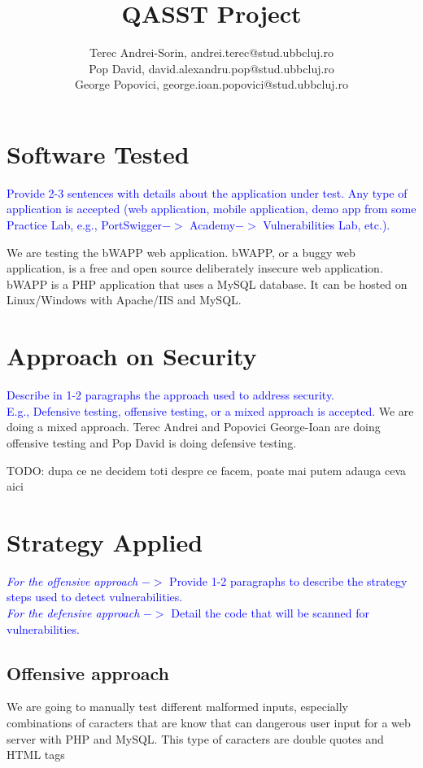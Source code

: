 \documentclass{article}
\title{\textbf{QASST Project}}
\author{Terec Andrei-Sorin, andrei.terec@stud.ubbcluj.ro\\
Pop David, david.alexandru.pop@stud.ubbcluj.ro\\
George Popovici, george.ioan.popovici@stud.ubbcluj.ro}
\begin{document}
\maketitle


\tableofcontents

\newpage

\section{Software Tested}
\label{label:Software_tested}

\textcolor{blue}{Provide 2-3 sentences with details about the application under test. Any type of application is accepted (web application, mobile application, demo app from some Practice Lab, e.g., PortSwigger$->$ Academy$->$ Vulnerabilities Lab, etc.).}

We are testing the bWAPP web application.
bWAPP, or a buggy web application, is a free and open source deliberately insecure web application.
bWAPP is a PHP application that uses a MySQL database. It can be hosted on Linux/Windows with Apache/IIS and MySQL.


\section{Approach on Security}
\label{}

\textcolor{blue}{Describe in 1-2 paragraphs the approach used to address security. \\
    E.g., Defensive testing, offensive testing, or a mixed approach is accepted.
}
We are doing a mixed approach.
Terec Andrei and Popovici George-Ioan are doing offensive testing and Pop David is doing defensive testing.

TODO: dupa ce ne decidem toti despre ce facem, poate mai putem adauga ceva aici

\section{Strategy Applied}
\label{}

\textcolor{blue}{\textit{For the offensive approach} $->$ Provide 1-2 paragraphs to describe the strategy steps used to detect vulnerabilities.\\
    \textit{For the defensive approach} $->$ Detail the code that will be scanned for vulnerabilities.
}

\subsection{Offensive approach}
We are going to manually test different malformed inputs, especially combinations of caracters that are know that can dangerous user input for a web server with PHP and MySQL.
This type of caracters are double quotes and HTML tags
\end{document}
